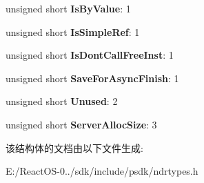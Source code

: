 \begin{DoxyCompactItemize}
unsigned short {\bfseries Is\+By\+Value}\+: 1
\item 
\mbox{\label{struct_p_a_r_a_m___a_t_t_r_i_b_u_t_e_s_a3635ec02f1351f2fc138a144b943385d}} 
unsigned short {\bfseries Is\+Simple\+Ref}\+: 1
\item 
\mbox{\label{struct_p_a_r_a_m___a_t_t_r_i_b_u_t_e_s_abc6814fb2613f27b2e25bda3f0b693cc}} 
unsigned short {\bfseries Is\+Dont\+Call\+Free\+Inst}\+: 1
\item 
\mbox{\label{struct_p_a_r_a_m___a_t_t_r_i_b_u_t_e_s_a5e76dc1fdf94aa4c371fcf630f4d8a9f}} 
unsigned short {\bfseries Save\+For\+Async\+Finish}\+: 1
\item 
\mbox{\label{struct_p_a_r_a_m___a_t_t_r_i_b_u_t_e_s_a12d7600f372562666ad042c92fc80d2e}} 
unsigned short {\bfseries Unused}\+: 2
\item 
\mbox{\label{struct_p_a_r_a_m___a_t_t_r_i_b_u_t_e_s_a48a930792539d1474017c2e2097ebb69}} 
unsigned short {\bfseries Server\+Alloc\+Size}\+: 3
\end{DoxyCompactItemize}


该结构体的文档由以下文件生成\+:\begin{DoxyCompactItemize}
\item 
E\+:/\+React\+O\+S-\/0../sdk/include/psdk/ndrtypes.\+h\end{DoxyCompactItemize}
